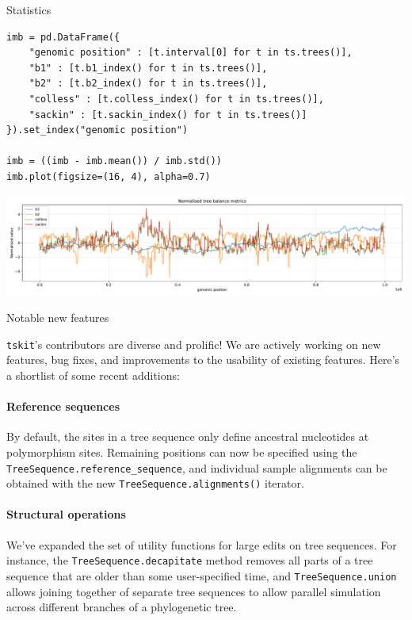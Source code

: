 \documentclass[landscape,a0paper,fontscale=0.4]{baposter}
\newcommand{\tskit}{{\texttt{tskit}}}
\begin{document}
\begin{poster}
\begin{posterbox}[name=stats,column=3,row=0,span=1]{Statistics}
\begin{verbatim}
imb = pd.DataFrame({
    "genomic position" : [t.interval[0] for t in ts.trees()],
    "b1" : [t.b1_index() for t in ts.trees()],
    "b2" : [t.b2_index() for t in ts.trees()],
    "colless" : [t.colless_index() for t in ts.trees()],
    "sackin" : [t.sackin_index() for t in ts.trees()]
}).set_index("genomic position")

imb = ((imb - imb.mean()) / imb.std())
imb.plot(figsize=(16, 4), alpha=0.7)
\end{verbatim}
\includegraphics[width=\textwidth]{tree_balance}

\end{posterbox}


\begin{posterbox}[name=operations,column=3,below=stats,span=1]{Notable new features}


\tskit{}'s contributors are diverse and prolific! We are actively working on
    new features, bug fixes, and improvements to the usability of existing
    features. Here's a shortlist of some recent additions:

\paragraph{Reference sequences}
By default, the sites in a tree sequence only define ancestral nucleotides at
    polymorphism sites. Remaining positions can now be specified using the
    \texttt{TreeSequence.reference\_sequence}, and individual sample alignments can
    be obtained with the new \texttt{TreeSequence.alignments()} iterator.

\paragraph{Structural operations}
We've expanded the set of utility functions for large edits on tree sequences.
    For instance, the \texttt{TreeSequence.decapitate} method removes all parts of a
    tree sequence that are older than some user-specified time,
    and \texttt{TreeSequence.union} allows joining together of separate tree sequences
    to allow parallel simulation across different branches of a phylogenetic tree.


\end{posterbox}
\end{poster}
\end{document}
